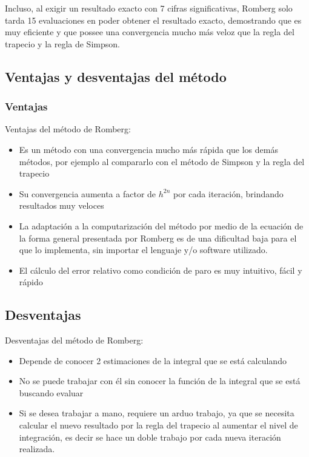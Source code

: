 \documentclass[journal,transmag]{IEEEtran}
\theoremstyle{mytheoremstyle}
\theoremstyle{mytheoremstyle}
\theoremstyle{myproblemstyle}
\begin{document}
        Incluso, al exigir un resultado exacto con 7 cifras significativas, Romberg solo tarda 15 evaluaciones en poder
        obtener el resultado exacto, demostrando que es muy eficiente y que possee una convergencia mucho más veloz
        que la regla del trapecio y la regla de Simpson.

\subsection{Ventajas y desventajas del método}
    \subsubsection{Ventajas}
    \begin{center}
    Ventajas del método de Romberg:
    \end{center}
    \begin{itemize}
        \item   Es un método con una convergencia mucho más rápida que los demás métodos, 
        por ejemplo al compararlo con el método de Simpson y la regla del trapecio
        \item   Su convergencia aumenta a factor de $h^{2n}$ por cada iteración, brindando resultados muy veloces
        \item   La adaptación a la computarización del método por medio de la 
        ecuación de la forma general presentada por Romberg es de una dificultad baja para el que lo implementa,
        sin importar el lenguaje y/o software utilizado.
        \item   El cálculo del error relativo como condición de paro es muy intuitivo, fácil y rápido
    \end{itemize}
    \subsection{Desventajas}
    \begin{center}
    Desventajas del método de Romberg:
    \end{center}
    \begin{itemize}
        \item   Depende de conocer 2 estimaciones de la integral que se está calculando
        \item   No se puede trabajar con él sin conocer la función de la integral que se está buscando evaluar
        \item   Si se desea trabajar a mano, requiere un arduo trabajo, ya que se necesita calcular 
        el nuevo resultado por la regla del trapecio al aumentar el nivel de integración, es decir se hace 
        un doble trabajo por cada nueva iteración realizada.
    \end{itemize}
\end{document}
